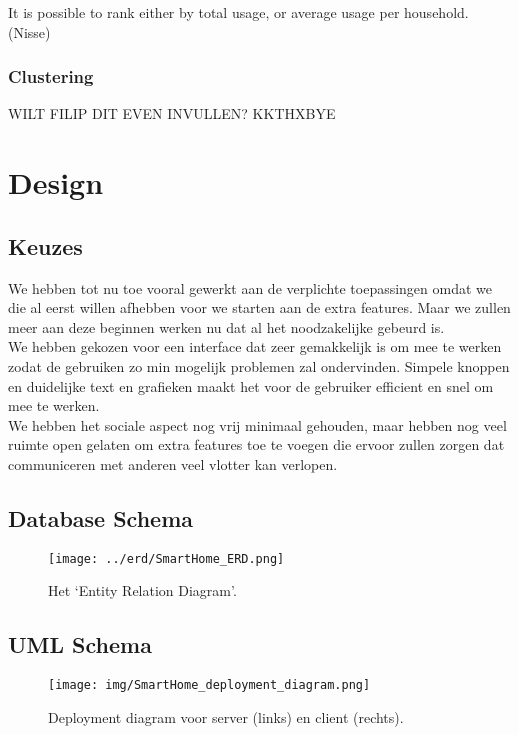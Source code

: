 \documentclass[11pt]{article}
\begin{document}
		It is possible to rank either by total usage, or average usage per household.\\

		(Nisse)

	\subsubsection{Clustering}
		WILT FILIP DIT EVEN INVULLEN? KKTHXBYE

\section{Design}
  \subsection{Keuzes}
	We hebben tot nu toe vooral gewerkt aan de verplichte toepassingen omdat we die al eerst willen
	afhebben voor we starten aan de extra features. Maar we zullen meer aan deze beginnen
	werken nu dat al het noodzakelijke gebeurd is.\\

	We hebben gekozen voor een interface dat zeer gemakkelijk is om mee te werken zodat de
	gebruiken zo min mogelijk problemen zal ondervinden. Simpele knoppen en duidelijke text en
	grafieken maakt het voor de gebruiker efficient en snel om mee te werken.\\
	
	We hebben het sociale aspect nog vrij minimaal gehouden, maar hebben nog veel ruimte open
	gelaten om extra features toe te voegen die ervoor zullen zorgen dat communiceren met anderen
	veel vlotter kan verlopen.

  \subsection{Database Schema}
  \begin{figure}[H]
  \centering
    \texttt{[image: ../erd/SmartHome\_ERD.png]}
  \caption{Het `Entity Relation Diagram'.}
  \label{fig:erd}
  \end{figure}
  
  \subsection{UML Schema}
  \begin{figure}[H]
  \centering
    \texttt{[image: img/SmartHome\_deployment\_diagram.png]}
  \caption{Deployment diagram voor server (links) en client (rechts).}
  \label{fig:uml}
  \end{figure}
\end{document}
